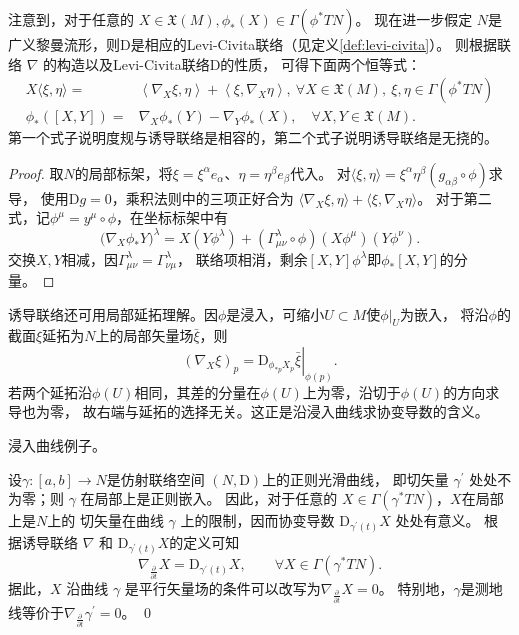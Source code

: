 注意到，对于任意的 $X \in \mathfrak{X}(M), \phi_*(X) \in \Gamma(\phi^* T N)$。
现在进一步假定 $N$是广义黎曼流形，则$\mathrm{D}$是相应的Levi-Civita联络（见定义\ref{def:levi-civita}）。
则根据联络 $\nabla$ 的构造以及Levi-Civita联络$\mathrm{D}$的性质，
可得下面两个恒等式：
\begin{align}
    X\langle\xi, \eta\rangle= &\left\langle\nabla_X \xi, \eta\right\rangle+\left\langle\xi,
     \nabla_X \eta\right\rangle, \ \forall X \in \mathfrak{X}(M),\ \xi, \eta \in \Gamma(\phi^* T N)
      \\
    \phi_*([X, Y])=&\nabla_X \phi_*(Y)-\nabla_Y \phi_*(X), \quad \forall X, Y \in \mathfrak{X}(M) .
\end{align}
第一个式子说明度规与诱导联络是相容的，第二个式子说明诱导联络是无挠的。
\begin{proof}
取$N$的局部标架，将$\xi=\xi^\alpha e_\alpha$、$\eta=\eta^\beta e_\beta$代入。
对$\langle\xi,\eta\rangle=\xi^\alpha\eta^\beta(g_{\alpha\beta}\circ\phi)$求导，
使用$\mathrm D g=0$，乘积法则中的三项正好合为
$\langle\nabla_X\xi,\eta\rangle+\langle\xi,\nabla_X\eta\rangle$。
对于第二式，记$\phi^\mu=y^\mu\circ\phi$，在坐标标架中有
\[
 \bigl(\nabla_X\phi_*Y\bigr)^\lambda
 =X(Y\phi^\lambda)
  +(\Gamma^\lambda_{\mu\nu}\circ\phi)(X\phi^\mu)(Y\phi^\nu).
\]
交换$X,Y$相减，因$\Gamma^\lambda_{\mu\nu}=\Gamma^\lambda_{\nu\mu}$，
联络项相消，剩余$[X,Y]\phi^\lambda$即$\phi_*[X,Y]$的分量。
\end{proof}

诱导联络还可用局部延拓理解。因$\phi$是浸入，可缩小$U\subset M$使$\phi|_U$为嵌入，
将沿$\phi$的截面$\xi$延拓为$N$上的局部矢量场$\bar\xi$，则
\begin{equation}
    (\nabla_X\xi)_p=\left.\mathrm D_{\phi_{*p}X_p}\bar\xi\right|_{\phi(p)} .
\end{equation}
若两个延拓沿$\phi(U)$相同，其差的分量在$\phi(U)$上为零，沿切于$\phi(U)$的方向求导也为零，
故右端与延拓的选择无关。这正是沿浸入曲线求协变导数的含义。

\begin{example}
    浸入曲线例子。
\end{example}
设$\gamma:[a, b] \rightarrow N$是仿射联络空间 $(N, \mathrm{D})$上的正则光滑曲线，
即切矢量 $\gamma^{\prime}$ 处处不为零；则 $\gamma$ 在局部上是正则嵌入。
因此，对于任意的 $X \in \Gamma(\gamma^* TN)$，$X$在局部上是$N$上的
切矢量在曲线 $\gamma$ 上的限制，因而协变导数 $\mathrm{D}_{\gamma^{\prime}(t)} X$ 处处有意义。
根据诱导联络 $\nabla$ 和 $\mathrm{D}_{\gamma^{\prime}(t)} X$的定义可知
\begin{equation}
    \nabla_{\frac{\partial}{\partial t}} X=\mathrm{D}_{\gamma^{\prime}(t)} X,
    \qquad \forall X \in \Gamma(\gamma^* T N) .
\end{equation}
据此，$X$ 沿曲线 $\gamma$ 是平行矢量场的条件可以改写为$\nabla_{\frac{\partial}{\partial t}} X=0$。
特别地，$\gamma$是测地线等价于$\nabla_{\frac{\partial}{\partial t}} \gamma^{\prime}=0$。
\qed

